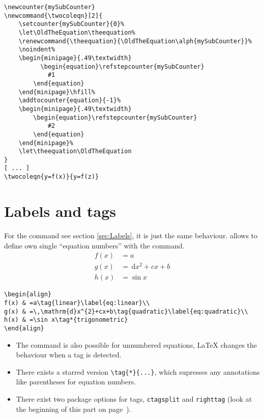 \begin{table}[htb]
\begin{lstlisting}
\newcounter{mySubCounter}
\newcommand{\twocoleqn}[2]{
    \setcounter{mySubCounter}{0}%
    \let\OldTheEquation\theequation%
    \renewcommand{\theequation}{\OldTheEquation\alph{mySubCounter}}%
    \noindent%
    \begin{minipage}{.49\textwidth}
          \begin{equation}\refstepcounter{mySubCounter}
            #1
        \end{equation}
    \end{minipage}\hfill%
    \addtocounter{equation}{-1}%
    \begin{minipage}{.49\textwidth}
        \begin{equation}\refstepcounter{mySubCounter}
            #2
        \end{equation}
    \end{minipage}%
    \let\theequation\OldTheEquation
}
[ ... ]
\twocoleqn{y=f(x)}{y=f(z)}
\end{lstlisting}


\section{Labels and tags}\label{sec:Labels-and-Tags}

For the  command 
see section \vref{sec:Labels}, it is just the same behaviour. \AmSmath
allows to define own single ``equation numbers''
with the  command. 
\begin{align}
f(x) & =a\tag{linear}\label{eq:linear}\\
g(x) & =\,\mathrm{d}x^{2}+cx+b\tag{quadratic}\label{eq:quadratic}\\
h(x) & =\sin x\tag*{trigonometric}
\end{align}

\begin{lstlisting}
\begin{align}
f(x) & =a\tag{linear}\label{eq:linear}\\
g(x) & =\,\mathrm{d}x^{2}+cx+b\tag{quadratic}\label{eq:quadratic}\\
h(x) & =\sin x\tag*{trigonometric}
\end{align}
\end{lstlisting}

\begin{itemize}
\item The  command is also possible for unnumbered
equations, \LaTeX{} changes the behaviour when a tag is detected.
\item There exists a starred version \verb|\tag{*}{...}|,    %
which supresses any annotations like parentheses for equation numbers.
\item There exist two package options for tags, \verb|ctagsplit|    %
and \verb|righttag| (look at the beginning of this
part on page~\pageref{par:AMSmath-package}).
\end{itemize}



\end{table}
